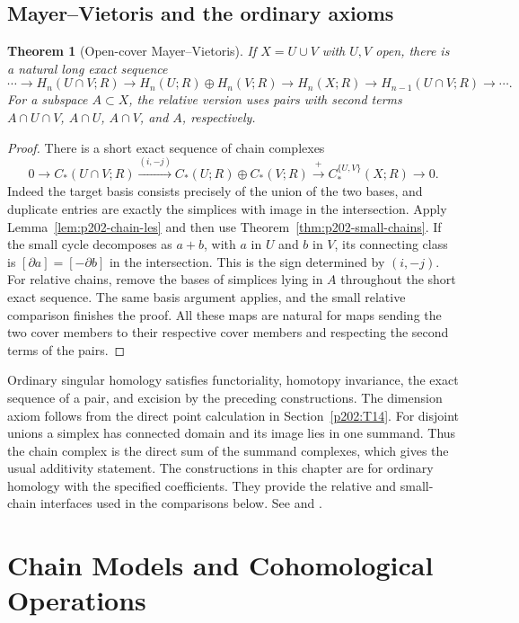 \documentclass[11pt,oneside,openany]{book}
\theoremstyle{plain}
\newtheorem{theorem}{Theorem}[chapter]
\theoremstyle{definition}
\theoremstyle{remark}
\begin{document}
\section{Mayer--Vietoris and the ordinary axioms}\label{p202:T18}

\begin{theorem}[Open-cover Mayer--Vietoris]
\label{thm:p202-mv}
If \(X=U\cup V\) with \(U,V\) open, there is a natural
long exact sequence
\[
 \cdots\to H_n(U\cap V;R)\to H_n(U;R)\oplus H_n(V;R)
 \to H_n(X;R)\to H_{n-1}(U\cap V;R)\to\cdots .
\]
For a subspace \(A\subset X\), the relative version
uses pairs with second terms \(A\cap U\cap V\),
\(A\cap U\), \(A\cap V\), and \(A\), respectively.
\end{theorem}

\begin{proof}
There is a short exact sequence of chain complexes
\[
 0\to C_*(U\cap V;R)
 \xrightarrow{(i,-j)} C_*(U;R)\oplus C_*(V;R)
 \xrightarrow{+} C_*^{\{U,V\}}(X;R)\to0 .
\]
Indeed the target basis consists precisely of the
union of the two bases, and duplicate entries are
exactly the simplices with image in the intersection.
Apply Lemma~\ref{lem:p202-chain-les} and then use
Theorem~\ref{thm:p202-small-chains}. If the small
cycle decomposes as \(a+b\), with \(a\) in \(U\) and
\(b\) in \(V\), its connecting class is
\([\partial a]=[-\partial b]\) in the intersection.
This is the sign determined by \((i,-j)\).
For relative chains, remove the bases of simplices
lying in \(A\) throughout the short exact sequence.
The same basis argument applies, and the small
relative comparison finishes the proof. All these maps
are natural for maps sending the two cover members
to their respective cover members and respecting the
second terms of the pairs.
\end{proof}

Ordinary singular homology satisfies functoriality,
homotopy invariance, the exact sequence of a pair,
and excision by the preceding constructions. The
dimension axiom follows from the direct point
calculation in Section~\ref{p202:T14}.
For disjoint unions a simplex has connected domain
and its image lies in one summand. Thus the chain
complex is the direct sum of the summand complexes,
which gives the usual additivity statement. The
constructions in this chapter are for ordinary homology
with the specified coefficients. They provide the
relative and small-chain interfaces used in the
comparisons below. See \cite[Sections 2.1--2.3]{Hatcher}
and \cite[Sections 3.2--3.6 and 4.2--4.4]{MKP}.
\chapter{Chain Models and Cohomological Operations}
\end{document}
